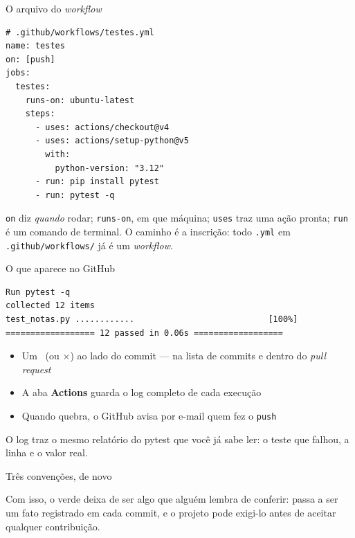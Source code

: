 \documentclass[aspectratio=169]{beamer}
\begin{document}
\begin{frame}[fragile]{O arquivo do \emph{workflow}}
\begin{lstlisting}[style=yaml]
# .github/workflows/testes.yml
name: testes
on: [push]
jobs:
  testes:
    runs-on: ubuntu-latest
    steps:
      - uses: actions/checkout@v4
      - uses: actions/setup-python@v5
        with:
          python-version: "3.12"
      - run: pip install pytest
      - run: pytest -q
\end{lstlisting}
  \vspace{-0.5em}
  \small \texttt{on} diz \emph{quando} rodar; \texttt{runs-on}, em que máquina;
  \texttt{uses} traz uma ação pronta; \texttt{run} é um comando de terminal.
  O caminho é a inscrição: todo \texttt{.yml} em \texttt{.github/workflows/}
  já é um \emph{workflow}.
\end{frame}

\begin{frame}[fragile]{O que aparece no GitHub}
\begin{lstlisting}[style=terminal]
Run pytest -q
collected 12 items
test_notas.py ............                           [100%]
================== 12 passed in 0.06s ==================
\end{lstlisting}
  \vspace{0.2em}
  \begin{itemize}
    \item \small Um \checkmark\ (ou $\times$) ao lado do commit --- na lista de
      commits e dentro do \emph{pull request}
    \item \small A aba \textbf{Actions} guarda o log completo de cada execução
    \item \small Quando quebra, o GitHub avisa por e-mail quem fez o \texttt{push}
  \end{itemize}
  \small O log traz o mesmo relatório do pytest que você já sabe ler: o teste
  que falhou, a linha e o valor real.
\end{frame}

\begin{frame}{Três convenções, de novo}
  \begin{center}
  \end{center}
  \vspace{0.4em}
  \small Com isso, o verde deixa de ser algo que alguém lembra de conferir:
  passa a ser um fato registrado em cada commit, e o projeto pode exigi-lo
  antes de aceitar qualquer contribuição.
\end{frame}
\end{document}
